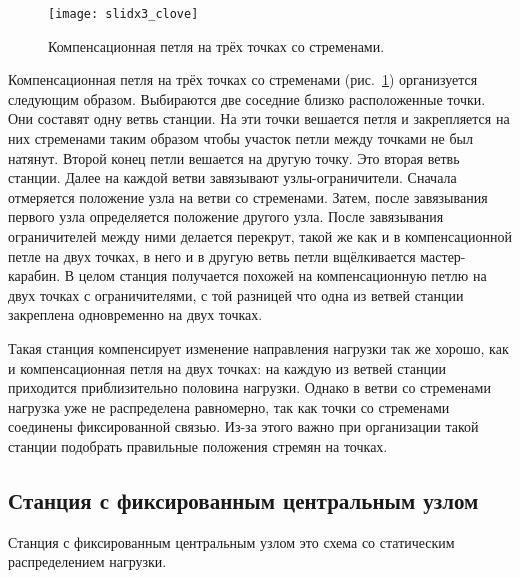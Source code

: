 \documentclass[fleqn, 12pt]{extarticle}
\begin{document}
    \begin{figure}[h]
        \centering
        \texttt{[image: slidx3\_clove]}
        \caption{Компенсационная петля на трёх точках со стременами.}\label{fig:slidx3_clove}
    \end{figure}
    Компенсационная петля на трёх точках со стременами (рис.~\ref{fig:slidx3_clove}) организуется следующим образом. Выбираются две соседние близко расположенные точки. Они составят
    одну ветвь станции. На эти точки вешается петля и закрепляется на них стременами таким образом чтобы участок петли между точками не был натянут. Второй конец петли вешается на другую точку.
    Это вторая ветвь станции. Далее на каждой ветви завязывают узлы-ограничители. Сначала отмеряется положение узла на ветви со стременами. Затем, после завязывания
    первого узла определяется положение другого узла. После завязывания ограничителей между ними делается перекрут, такой же как и в компенсационной петле на двух точках, в него и в другую
    ветвь петли вщёлкивается мастер-карабин. В целом станция получается похожей на компенсационную петлю на двух точках с ограничителями, с той разницей что одна из ветвей станции
    закреплена одновременно на двух точках.
    
    Такая станция компенсирует изменение направления нагрузки так же хорошо,
    как и компенсационная петля на двух точках: на каждую из ветвей станции приходится приблизительно половина нагрузки. Однако в ветви со стременами нагрузка уже не
    распределена равномерно, так как точки со стременами соединены фиксированной связью. Из-за этого важно при организации такой станции подобрать правильные
    положения стремян на точках.

\subsection{Станция с фиксированным центральным узлом}\label{sec:cordelette}
    Станция с фиксированным центральным узлом это схема со статическим распределением нагрузки.
\end{document}

